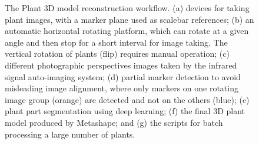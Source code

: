\begin{figure}[htb]
  \begin{center}
  \end{center}
  \caption[The plant 3D model reconstruction workflow]{
    The Plant 3D model reconstruction workflow. (a) devices for taking plant images, with a marker plane used as scalebar references; (b) an automatic horizontal rotating platform, which can rotate at a given angle and then stop for a short interval for image taking. The vertical rotation of plants (flip) requires manual operation; (c) different photographic perspectives images taken by the infrared signal auto-imaging system; (d) partial marker detection to avoid misleading image alignment, where only markers on one rotating image group (orange) are detected and not on the others (blue); (e) plant part segmentation using deep learning; (f) the final 3D plant model produced by Metashape; and (g) the scripts for batch processing a large number of plants.
  }
  \label{fig:des_img_recons}
\end{figure}